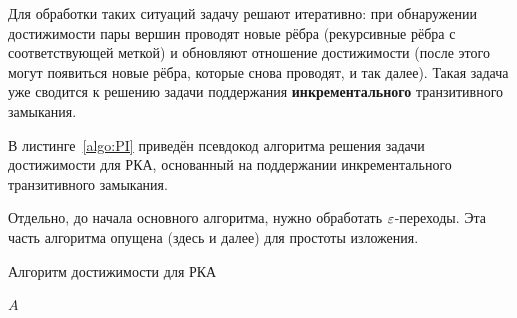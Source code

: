 Для обработки таких ситуаций задачу решают итеративно: при обнаружении достижимости пары вершин проводят новые рёбра (рекурсивные рёбра с соответствующей меткой) и обновляют отношение достижимости (после этого могут появиться новые рёбра, которые снова проводят, и так далее). Такая задача уже сводится к решению задачи поддержания {\bf инкрементального} транзитивного замыкания.

\begin{definition}
  \TODO
\end{definition}

В листинге~\ref{algo:PI} приведён псевдокод алгоритма решения задачи достижимости для РКА, основанный на поддержании инкрементального транзитивного замыкания.

\begin{note}
  Отдельно, до начала основного алгоритма, нужно обработать $\varepsilon$-переходы. Эта часть алгоритма опущена (здесь и далее) для простоты изложения. 
\end{note}

\begin{algorithm}[h]
    \begin{algorithmic}[1]
    \caption{Алгоритм достижимости для РКА}
    \label{algo:PI}
            \EndFor
        \EndFor
            \EndIf
                        \EndIf
                    \EndFor
                \EndIf
            \EndFor
        \EndWhile
    \State \Return $A$
    \EndFunction
    \end{algorithmic}
\end{algorithm}

